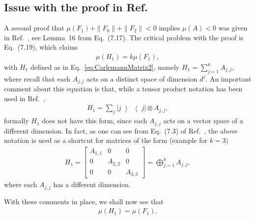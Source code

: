 \documentclass[superscriptaddress,onecolumn,nofootinbib,longbibliography,a4paper,accepted=2026-09-29]{quantumarticle}
\theoremstyle{plain}
\theoremstyle{definition}
\numberwithin{thm}{section}
\numberwithin{assumption}{section}
\numberwithin{lemma}{section}
\numberwithin{prop}{section}
\numberwithin{cor}{section}
\numberwithin{definition}{section}
\numberwithin{rmk}{section}
\numberwithin{equation}{section}
\newcommand{\ketbra}[2]   {\left|#1\middle\rangle\!\middle\langle#2\right|}
\begin{document}

\subsection{Issue with the proof in \texorpdfstring{Ref.~\cite{krovi2023improved}}{arXiv:2202.01054}}
\label{app:issuekrovi}

A second proof that $\mu(F_1) + \| F_0\| + \| F_2\| <0$ implies $\mu(A)<0$ was given in Ref.~\cite{krovi2023improved}, see Lemma~16 from Eq.~(7.17). The critical problem with the proof is Eq.~(7.19), which claims
\begin{align}
    \mu(H_1) = k \mu(F_1),
\end{align}
with  $H_1$ defined as in Eq.~\eqref{eq:CarlemannMatrix2}, namely $H_1 = \sum_{j=1}^{k} A_{j,j}$, where recall that each $A_{j,j}$ acts on a distinct space of dimension $d^j$. An important comment about this equation is that, while a tensor product notation has been used in Ref.~\cite{krovi2023improved}, 
\begin{align}
    H_1 = \sum_j \ketbra{j}{j} \otimes A_{j,j},
\end{align}
formally $H_1$ does not have this form, since each $A_{j,j}$ acts on a vector space of a different dimension.  In fact, as one can see from Eq.~(7.3) of Ref.~\cite{krovi2023improved}, the above notation is used as a shortcut for matrices of the form (example for $k =3)$
\begin{align}
    H_1 = \begin{bmatrix} 
    A_{1,1} & 0 & 0  \\ 
    0 & A_{2,2} & 0  \\
    0 & 0 & A_{3,3}
    \end{bmatrix} = \bigoplus_{j=1}^{k} A_{j,j},
\end{align}
where each $A_{j,j}$ has a different dimension. 

With these comments in place, we shall now see that
\begin{align}
    \mu(H_1) = \mu(F_1).
\end{align}
\end{document}
